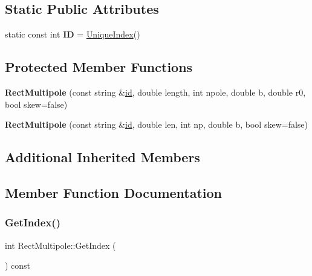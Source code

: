 \subsection*{Static Public Attributes}
\begin{DoxyCompactItemize}
\item 
\mbox{\label{classRectMultipole_a8cb07d2f2a4bf86dfdd65ae569714489}} 
static const int {\bfseries ID} = \hyperlink{classAcceleratorComponent_aa7ad4d39e1a488b705983842ed1ac784}{Unique\+Index}()
\end{DoxyCompactItemize}
\subsection*{Protected Member Functions}
\begin{DoxyCompactItemize}
\item 
\mbox{\label{classRectMultipole_a61c242922ceb6b62c327031e2d0850e9}} 
{\bfseries Rect\+Multipole} (const string \&\hyperlink{classModelElement_aada171ead2085c75b592cf07d91bc5c2}{id}, double length, int npole, double b, double r0, bool skew=false)
\item 
\mbox{\label{classRectMultipole_ac5d1d71f5c835bfe6bf0a9259f1d139f}} 
{\bfseries Rect\+Multipole} (const string \&\hyperlink{classModelElement_aada171ead2085c75b592cf07d91bc5c2}{id}, double len, int np, double b, bool skew=false)
\end{DoxyCompactItemize}
\subsection*{Additional Inherited Members}


\subsection{Member Function Documentation}
\mbox{\label{classRectMultipole_a9bc789b2a193e341aab8bbd47a0e3ad4}} 
\subsubsection{\texorpdfstring{Get\+Index()}{GetIndex()}}
{\footnotesize\ttfamily int Rect\+Multipole\+::\+Get\+Index (\begin{DoxyParamCaption}{ }\end{DoxyParamCaption}) const\hspace{0.3cm}{\ttfamily [virtual]}}

